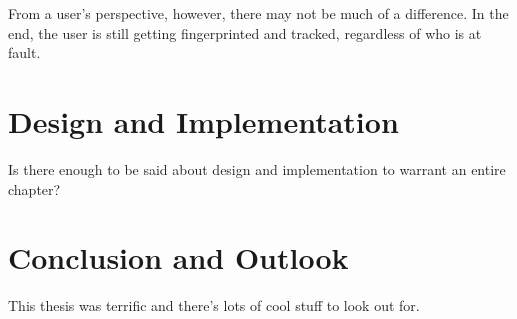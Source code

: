 \documentclass[
    fontsize=12pt,
    headings=small,
    parskip=half,
    bibliography=totoc,
    numbers=noenddot,
    open=any
    ]{scrreprt}
\begin{document}
From a user's perspective, however, there may not be much of a difference.
In the end, the user is still getting fingerprinted and tracked, regardless
of who is at fault.




\chapter{Design and Implementation}
Is there enough to be said about design and implementation to warrant an entire chapter?


\chapter{Conclusion and Outlook}
This thesis was terrific and there's lots of cool stuff to look out for.


\end{document}
